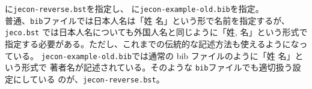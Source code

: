\documentclass[platex]{jsarticle}
\begin{document}
\verb||に\verb|jecon-reverse.bst|を指定し、
\verb||に\verb|jecon-example-old.bib|を指定。
\vspace{1em}\\

普通、\verb|bib|ファイルでは日本人名は「姓 名」という形で名前を指定するが、
\verb|jeco.bst| では日本人名についても外国人名と同じように「姓, 名」という形式で
指定する必要がある。ただし、これまでの伝統的な記述方法も使えるようになっている。
\verb|jecon-example-old.bib|では通常の bib ファイルのように「姓 名」という形式で
著者名が記述されている。そのような \verb|bib|ファイルでも適切扱う設定にしている
のが、\verb|jecon-reverse.bst|。
\vspace{1em}\\



\nocite{*}


% 

%

\end{document}
